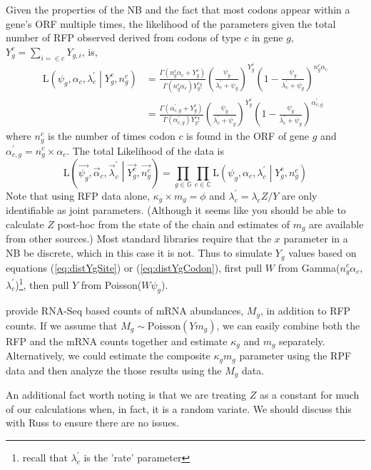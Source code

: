 \documentclass{article}
\newcommand{\alphac}{\ensuremath{{\alpha_c}}\xspace}
\newcommand{\alphacgprime}{\ensuremath{{\alpha_{c,g}^\prime}}\xspace}
\newcommand{\alphacvec}{\ensuremath{{\vec{\alpha}_c}}\xspace}
\newcommand{\lambdac}{\ensuremath{{\lambda_c}}\xspace}
\newcommand{\lambdacprime}{\ensuremath{{\lambda_c^\prime}}\xspace}
\newcommand{\lambdacprimevec}{\ensuremath{{\vec{\lambda}_c^\prime}}\xspace}
\newcommand{\ngc}{\ensuremath{{n_{g}^c}}\xspace}
\newcommand{\mg}{\ensuremath{{m_g}}\xspace}
\newcommand{\Mg}{\ensuremath{{M_g}}\xspace}
\newcommand{\psig}{\ensuremath{{\psi_g}}\xspace}
\newcommand{\kappag}{\ensuremath{{\kappa_{g}}}\xspace}
\newcommand{\Ztheta}{\ensuremath{{Z}}\xspace}
\newcommand{\Yg}{\ensuremath{{Y_{g}}}\xspace}
\newcommand{\Ytotal}{\ensuremath{{Y}}\xspace}
\newcommand{\Ygi}{\ensuremath{{Y_{g,i}}}\xspace}
\newcommand{\Ygc}{\ensuremath{{Y_{g}^c}}\xspace}
\newcommand{\Lik}{\ensuremath{\text{L}}\xspace}
\newcommand{\setG}{\ensuremath{\mathbb{G}}\xspace}
\newcommand{\setC}{\ensuremath{\mathbb{C}}\xspace}
\newcommand{\Ygcvec}{\ensuremath{{\Vec{\Ygc}}}\xspace}
\newcommand{\ngcvec}{\ensuremath{{\Vec{\ngc}}}\xspace}
\newcommand{\psigvec}{\ensuremath{{\Vec{\psig}}}\xspace}
\begin{document}
Given the properties of the NB \citep[p.~141]{ForbesEtAl2011} and the fact that most codons appear within a gene's ORF multiple times, the likelihood of the parameters given the total number of RFP observed derived from codons of type $c$ in gene $g$, $\Ygc = \sum_{i=\in c} \Ygi$, is,
\begin{align}
  \Lik\left(\psig, \alphac, \lambdacprime \middle| \Ygc, \ngc\right) &= \frac{\Gamma\left(\ngc \alphac + \Ygc\right)}{\Gamma\left(\ngc \alphac\right) \Ygc!} 
  \left(\frac{\psig}{\lambdacprime + \psig}\right)^\Ygc \left(1-\frac{\psig}{\lambdacprime + \psig}\right)^{\ngc \alphac}\\
\label{eq:distYgCodon}&= \frac{\Gamma\left(\alphacgprime + \Ygc\right)}{\Gamma\left(\alphacgprime\right) \Ygc!} 
  \left(\frac{\psig}{\lambdacprime + \psig}\right)^\Ygc \left(1-\frac{\psig}{\lambdacprime + \psig}\right)^{\alphacgprime}
\end{align}
where $\ngc$ is the number of times codon $c$ is found in the ORF of gene $g$ and $\alphacgprime = \ngc \times \alphac$.
The total Likelihood of the data is
\begin{equation}
  \Lik\left(\psigvec, \alphacvec, \lambdacprimevec \middle| \Ygcvec, \ngcvec\right) = \prod_{g \in \setG} \prod_{c \in \setC}  \Lik\left(\psig, \alphac, \lambdacprime \middle| \Ygc, \ngc\right)
\end{equation}
Note that using RFP data alone, $\kappag \times \mg = \phi$ and $\lambdacprime = \lambdac \Ztheta/\Ytotal$ are only identifiable as joint parameters. 
(Although it seems like you should be able to calculate \Ztheta post-hoc from the state of the chain and estimates of \mg are available from other sources.)
Most standard libraries require that the $x$ parameter in a NB be discrete, which in this case it is not.
Thus to simulate \Yg values based on equations (\ref{eq:distYgSite}) or (\ref{eq:distYgCodon}), first pull $W$ from Gamma(\ngc \alphac, \lambdacprime)\footnote{recall that \lambdacprime is the 'rate' parameter}, then pull $Y$ from Poisson($W \psig$).
  
\citet{PopEtAl2014} provide RNA-Seq based counts of mRNA abundances, \Mg, in addition to RFP counts.
If we assume that $\Mg \sim \text{Poisson}(\Ytotal \mg)$, we can easily combine both the RFP and the mRNA counts together and estimate $\kappag$ and $\mg$ separately.
Alternatively, we could estimate the composite \kappag \mg parameter using the RPF data and then analyze the those results using the \Mg data.

An additional fact worth noting is that we are treating $Z$ as a constant for much of our calculations when, in fact, it is a random variate.
We should discuss this with Russ to ensure there are no issues.
\end{document}
